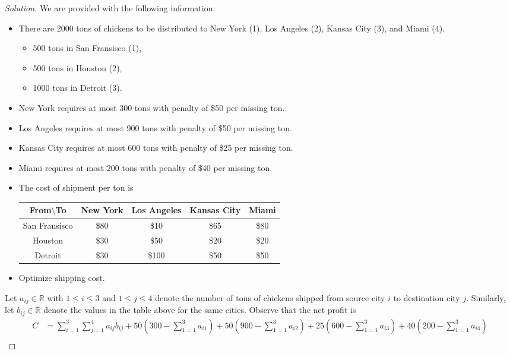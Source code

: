 \documentclass[ 12pt ]{article}
\begin{document}
\begin{enumerate}
		\begin{proof}[Solution]
			We are provided with the following information:
			\begin{itemize}
				\item There are 2000 tons of chickens to be distributed to New York (1), Los Angeles (2), Kansas City (3), and Miami (4).
				\begin{itemize}
					\item 500 tons in San Fransisco (1),
					\item 500 tons in Houston (2),
					\item 1000 tons in Detroit (3).
				\end{itemize}
				\item New York requires at most 300 tons with penalty of \$50 per missing ton.
				\item Los Angeles requires at most 900 tons with penalty of \$50 per missing ton.
				\item Kansas City requires at most 600 tons with penalty of \$25 per missing ton.
				\item Miami requires at most 200 tons with penalty of \$40 per missing ton.
				\item The cost of shipment per ton is
					\begin{center}
					\begin{tabular}{c|cccc}
						From$\setminus$To & New York & Los Angeles & Kansas City & Miami \\
						\hline
						San Fransisco & \$80 & \$10 & \$65 & \$80 \\
						Houston & \$30 & \$50 & \$20 & \$20 \\
						Detroit & \$30 & \$100 & \$50 & \$50
					\end{tabular}
					\end{center}
				\item Optimize shipping cost.
			\end{itemize}
			Let $a_{ij} \in \mathbb{R}$ with $1 \leq i \leq 3$ and $1 \leq j \leq 4$ denote the number of tons of chickens shipped from source city $i$ to destination city $j$.
			Similarly, let $b_{ij} \in \mathbb{R}$ denote the values in the table above for the same cities. Observe that the net profit is
			\begin{align*}
				C &= \sum_{i = 1}^3 \sum_{j = 1}^4 a_{ij}b_{ij} + 50 \left (300 - \sum_{1 = 1}^3 a_{i1} \right) + 50 \left (900 - \sum_{1 = 1}^3 a_{i2} \right) + 25 \left (600 - \sum_{1 =
					1}^3 a_{i3} \right) + 40 \left (200 - \sum_{1 = 1}^3 a_{i4} \right) \\

\end{align*}
\end{proof}
\end{enumerate}
\end{document}
